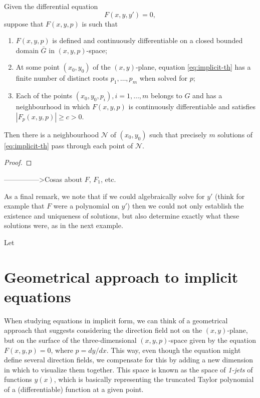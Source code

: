 \begin{theorem} Given the differential equation
\begin{equation}\label{eq:implicit-th}
  F(x,y,y')=0,
\end{equation}
suppose that $F(x,y,p)$ is such that
\begin{enumerate}
  \item $F(x,y,p)$ is defined and continuously differentiable on a closed bounded domain $\bar{G}$ in $(x,y,p)$-space;
  \item At some point $(x_0,y_0)$ of the $(x,y)$-plane, equation \eqref{eq:implicit-th} has a finite number of distinct roots $p_1,\dots,p_m$ when solved for $p$;
  \item Each of the points $(x_0,y_0,p_i), i=1,\dots,m$ belongs to $G$ and has a neighbourhood in which $F(x,y,p)$ is continuously differentiable and satisfies $|F_p(x,y,p)|\ge c > 0$.
\end{enumerate}
Then there is a neighbourhood $\mathcal N$ of $(x_0,y_0)$ such that precisely $m$ solutions of \eqref{eq:implicit-th} pass through each point of $\mathcal N$.

\end{theorem}

\begin{proof}

\end{proof}

--------------->Cosas about $F$, $F_1$, etc.

As a final remark, we note that if we could algebraically solve for $y'$ (think for example that $F$ were a polynomial on $y'$) then we could not only establish the existence and uniqueness of solutions, but also determine exactly what these solutions were, as in the next example.

\begin{example} Let

\end{example}

\section{Geometrical approach to implicit equations}

When studying equations in implicit form, we can think of a geometrical approach that suggests considering the direction field not on the $(x,y)$-plane, but on the surface of the three-dimensional $(x,y,p)$-space given by the equation $F(x,y,p)=0$, where $p=dy/dx$. This way, even though the equation might define several direction fields, we compensate for this by adding a new dimension in which to visualize them together. This space is known as the space of \textit{1-jets} of functions $y(x)$, which is basically representing the truncated Taylor polynomial of a (differentiable) function at a given point.
